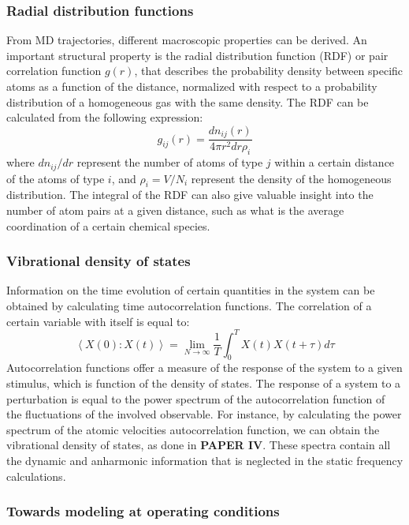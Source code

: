 \subsubsection*{Radial distribution functions}
From MD trajectories, different macroscopic properties can be derived. An important structural property is the radial distribution function (RDF) or pair correlation function $g(r)$, that describes the probability density between specific atoms as a function of the distance, normalized with respect to a probability distribution of a homogeneous gas with the same density. The RDF can be calculated from the following expression:
\[
g_{ij}(r) = \dfrac{dn_{ij}(r)}{4\pi r^2 dr \rho_i}
\]
where $dn_{ij}/dr$ represent the number of atoms of type $j$ within a certain distance of the atoms of type $i$, and $\rho_i = V / N_i $ represent the density of the homogeneous distribution. The integral of the RDF can also give valuable insight into the number of atom pairs at a given distance, such as what is the average coordination of a certain chemical species.

\subsubsection*{Vibrational density of states}
Information on the time evolution of certain quantities in the system can be obtained by calculating time autocorrelation functions. The correlation of a certain variable with itself is equal to:
\[
\left\langle X(0):X(t)\right\rangle = \lim_{N \to \infty} \dfrac{1}{T}\int_{0}^{T}X(t)X(t+\tau)d\tau
\]
Autocorrelation functions offer a measure of the response of the system to a given stimulus, which is function of the density of states. The response of a system to a perturbation is equal to the power spectrum of the autocorrelation function of the fluctuations of the involved observable\cite{kubo1957statistical}. For instance, by calculating the power spectrum of the atomic velocities autocorrelation function, we can obtain the vibrational density of states, as done in \textbf{PAPER IV}. These spectra contain all the dynamic and anharmonic information that is neglected in the static frequency calculations.

\subsubsection*{Towards modeling at operating conditions}

